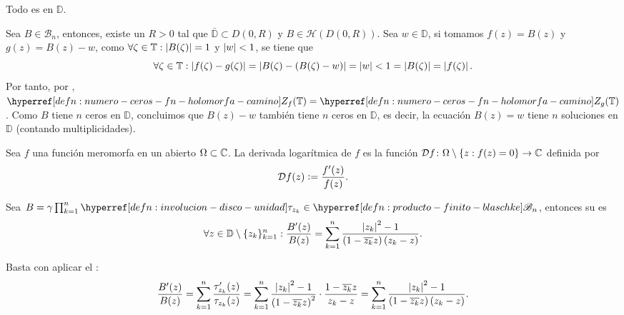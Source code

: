\begin{teo}\label{teo:n-valencia-prod-finito-blaschke-disco-unidad}
    Todo  es  en $\mathbb{D}$.
\end{teo}
\begin{dem}
    Sea $B \in \mathscr{B}_n$, entonces, existe un $R > 0$ tal que $\bar{\mathbb{D}} \subset D(0, R)$ y $B \in \mathcal{H}\left(D(0, R)\right)$. Sea $w \in \mathbb{D}$, si tomamos $f(z) = B(z)$ y $g(z) = B(z) - w$, como $\forall \zeta \in \mathbb{T} : \left|B(\zeta)\right| = 1$ y $\left|w\right| < 1$, se tiene que
    \[
    \forall \zeta \in \mathbb{T} : \left|f(\zeta) - g(\zeta)\right| = \left|B(\zeta) - (B(\zeta) - w)\right| = \left|w\right| < 1 = \left|B(\zeta)\right| = \left|f(\zeta)\right|.
    \]
    Por tanto, por , $\exhyperref[defn:numero-ceros-fn-holomorfa-camino]{numero-ceros-fn-holomorfa-camino}{Z_f}(\mathbb{T}) = \exhyperref[defn:numero-ceros-fn-holomorfa-camino]{numero-ceros-fn-holomorfa-camino}{Z_g}(\mathbb{T})$. Como $B$ tiene $n$ ceros en $\mathbb{D}$, concluimos que $B(z) - w$ también tiene $n$ ceros en $\mathbb{D}$, es decir, la ecuación $B(z) = w$ tiene $n$ soluciones en $\mathbb{D}$ (contando multiplicidades).\hfill\qedsymbol
\end{dem}

\begin{defn}\label{defn:derivada-logaritmica}
    Sea $f$ una función meromorfa en un abierto $\Omega \subset \mathbb{C}$. La derivada logarítmica de $f$ es la función $\mathcal{D} f \colon \Omega \setminus \{z : f(z) = 0\} \to \mathbb{C}$ definida por
    \[
    \mathcal{D} f (z) \vcentcolon= \frac{f'(z)}{f(z)}.
    \]
\end{defn}

\begin{lem}\label{lem:derivada-logaritmica-prod-finito-blaschke}
    Sea $B = \gamma \prod_{k=1}^n \exhyperref[defn:involucion-disco-unidad]{involucion-disco-unidad}{\tau_{z_k}} \in \exhyperref[defn:producto-finito-blaschke]{producto-finito-blaschke}{\mathscr{B}_n}$, entonces su  es
    \[
    \forall z \in \mathbb{D} \setminus \{z_k\}_{k=1}^n : \frac{B'(z)}{B(z)} = \sum_{k=1}^n \frac{\left|z_k\right|^2 - 1}{\left(1 - \overline{z_k} z\right) (z_k - z)}. 
    \]
\end{lem}
\begin{dem}
    Basta con aplicar el :
    \[
    \frac{B'(z)}{B(z)} = \sum_{k=1}^n \frac{\tau_{z_k}'(z)}{\tau_{z_k}(z)} = \sum_{k=1}^n \frac{\left|z_k\right|^2 - 1}{{\left(1 - \overline{z_k} z\right)}^2} \cdot \frac{1 - \overline{z_k} z}{z_k - z} = \sum_{k=1}^n \frac{\left|z_k\right|^2 - 1}{\left(1 - \overline{z_k} z\right) (z_k - z)}.
    \]

    \vspace{-\baselineskip}
    \vspace{-\belowdisplayskip}\hfill\qedsymbol
\end{dem}

